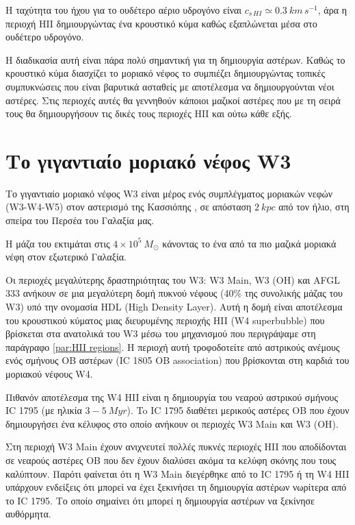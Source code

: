 \documentclass[a4paper,12pt]{memoir}
\newcommand{\e}[1]{\times 10^{#1}}
\begin{document}
Η ταχύτητα του ήχου για το ουδέτερο αέριο υδρογόνο είναι $c_{s \, HI}\simeq 0.3 \ km \, s^{-1}$, άρα η περιοχή HII δημιουργώντας ένα κρουστικό κύμα καθώς εξαπλώνεται μέσα στο ουδέτερο υδρογόνο. 

Η διαδικασία αυτή είναι πάρα πολύ σημαντική για τη δημιουργία αστέρων. Καθώς το κρουστικό κύμα διασχίζει το μοριακό νέφος το συμπιέζει δημιουργώντας τοπικές συμπυκνώσεις που είναι βαρυτικά ασταθείς με αποτέλεσμα να δημιουργούνται νέοι αστέρες. Στις περιοχές αυτές θα γεννηθούν κάποιοι μαζικοί αστέρες που με τη σειρά τους θα δημιουργήσουν τις δικές τους περιοχές HII και ούτω κάθε εξής.


\chapter{Το γιγαντιαίο μοριακό νέφος W3}

Το γιγαντιαίο μοριακό νέφος W3 είναι μέρος ενός συμπλέγματος μοριακών νεφών (W3-W4-W5) στον αστερισμό της Κασσιόπης , σε απόσταση $2 \ kpc$ από τον ήλιο, στη σπείρα του Περσέα του Γαλαξία μας. 

Η μάζα του εκτιμάται στις $4\e{5} \ M_{\odot}$ κάνοντας το ένα από τα πιο μαζικά μοριακά νέφη στον εξωτερικό Γαλαξία.

Οι περιοχές μεγαλύτερης δραστηριότητας του W3: W3 Main, W3 (OH) και AFGL 333 ανήκουν σε μια μεγαλύτερη δομή πυκνού νέφους (40\% της συνολικής μάζας του W3) υπό την ονομασία HDL (High Density Layer). Αυτή η δομή είναι αποτέλεσμα του κρουστικού κύματος μιας διευρυμένης περιοχής HII (W4 superbubble) που βρίσκεται στα ανατολικά του W3 μέσω του μηχανισμού που περιγράψαμε στη παράγραφο \ref{par:HII regions}. Η περιοχή αυτή τροφοδοτείτε από αστρικούς ανέμους ενός σμήνους OB αστέρων (IC 1805 OB association) που βρίσκονται στη καρδιά του μοριακού νέφους W4.

Πιθανόν αποτέλεσμα της W4 HII είναι η δημιουργία του νεαρού αστρικού σμήνους IC 1795 (με ηλικία $3-5 \ Myr$). To IC 1795 διαθέτει μερικούς αστέρες OB που έχουν δημιουργήσει ένα κέλυφος στο οποίο ανήκουν οι περιοχές W3 Main και W3 (OH).

Στη περιοχή W3 Main έχουν ανιχνευτεί πολλές πυκνές περιοχές HII που αποδίδονται σε νεαρούς αστέρες OB που δεν έχουν διαλύσει ακόμα τα κελύφη σκόνης που τους καλύπτουν. Παρότι φαίνεται ότι η W3 Main διεγέρθηκε από το IC 1795 ή τη W4 HII υπάρχουν ενδείξεις ότι μπορεί να έχει ξεκινήσει τη δημιουργία αστέρων νωρίτερα από το IC 1795. Το οποίο σημαίνει ότι μπορεί η δημιουργία αστέρων να ξεκίνησε αυθόρμητα.
\end{document}
